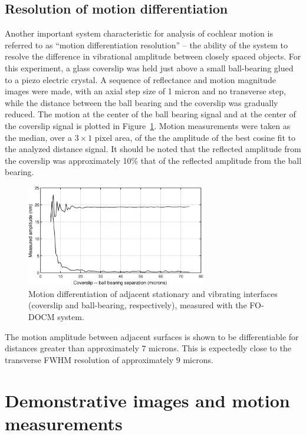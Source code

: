 \subsection{Resolution of motion differentiation}

Another important system characteristic for analysis of cochlear motion is referred to as ``motion differentiation resolution'' -- the ability of the system to resolve the difference in vibrational amplitude between closely spaced objects. For this experiment, a glass coverslip was held just above a small ball-bearing glued to a piezo electric crystal. A sequence of reflectance and motion magnitude images were made, with an axial step size of 1 micron and no transverse step, while the distance between the ball bearing and the coverslip was gradually reduced. The motion at the center of the ball bearing signal and at the center of the coverslip signal is plotted in Figure~\ref{fig:diff}. Motion measurements were taken as the median, over a $3 \times 1$ pixel area, of the the amplitude of the best cosine fit to the analyzed distance signal. It should be noted that the reflected amplitude from the coverslip was approximately 10\% that of the reflected amplitude from the ball bearing.

\begin{figure}[h!]
\centering
\includegraphics[width=0.7\textwidth]{Images/Results/differentiation.png}
\caption[Motion differentiation of adjacent stationary and vibrating interfaces.]{Motion differentiation of adjacent stationary and vibrating interfaces (coverslip and ball-bearing, respectively), measured with the FO-DOCM system.\label{fig:diff}}
\end{figure}

The motion amplitude between adjacent surfaces is shown to be differentiable for distances greater than approximately $7$ microns. This is expectedly close to the transverse FWHM resolution of approximately $9$ microns.

\section{Demonstrative images and motion measurements}

